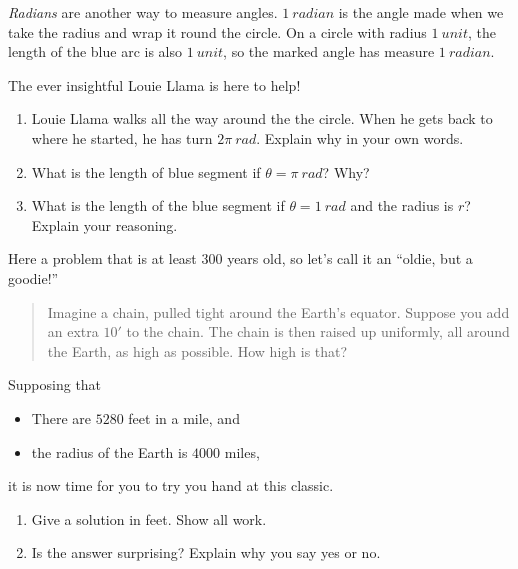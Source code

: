 \documentclass[noauthor,nooutcomes,handout]{../ximera}
\begin{document}
\begin{question}
\textit{Radians} are another way to measure angles. $1 \ radian$ is the angle made when we take the radius
and wrap it round the circle. On a circle with radius $1\ unit$, the length of the blue arc is also $1\ unit$, so the marked angle has measure $1 \ radian$.


\begin{center}
 
\end{center}

The ever insightful Louie Llama is here to help!

\begin{enumerate}
    \item Louie Llama walks all the way around the  the circle. When he gets back to where he started, he has turn $2\pi \ rad$. Explain why in your own words. 
    \item What is the length of blue segment if $\theta=\pi \ rad$? Why?
    \item What is the length of the blue segment if $\theta=1 \ rad$ and the radius is $r$? Explain your reasoning.
\end{enumerate}
\end{question}
\mynewpage

\begin{question}
  Here a problem that is at least $300$ years old, so let's call it an  ``oldie, but a goodie!''
  \begin{quote}
    Imagine a chain, pulled tight around the Earth's equator. Suppose
   you add an extra $10'$ to the chain. The chain is then raised up
    uniformly, all around the Earth, as high as possible. How high is    that?
  \end{quote}
  Supposing that
  \begin{itemize}
  \item There are $5280$ feet in a mile, and
  \item the radius of the Earth is $4000$ miles,
  \end{itemize}
  it is now time for you to try you hand at this classic.
  \begin{enumerate}
  \item Give a solution in feet. Show all work.
  \item Is the answer surprising? Explain why you say yes or no.
  \end{enumerate}
\end{question}
\end{document}

